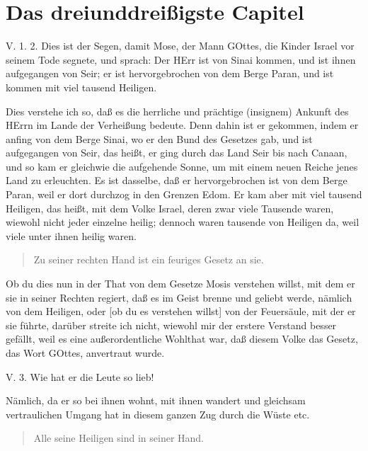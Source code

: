 \section{Das dreiunddreißigste Capitel}

\begin{schriftzitat}
V. 1. 2. Dies ist der Segen, damit Mose, der Mann GOttes, die Kinder Israel vor seinem Tode segnete, und sprach: Der HErr ist von Sinai kommen, und ist ihnen aufgegangen von Seir; er ist hervorgebrochen von dem Berge Paran, und ist kommen mit viel tausend Heiligen.
\end{schriftzitat}

Dies verstehe ich so, daß es die herrliche und prächtige (insignem) Ankunft des HErrn im Lande der Verheißung bedeute. Denn dahin ist er gekommen, indem er anfing von dem Berge Sinai, wo er den Bund des Gesetzes gab, und ist aufgegangen von Seir, das heißt, er ging durch das Land Seir bis nach Canaan, und so kam er gleichwie die aufgehende Sonne, um mit einem neuen Reiche jenes Land zu erleuchten. Es ist dasselbe, daß er hervorgebrochen ist von dem Berge Paran, weil er dort durchzog in den Grenzen Edom. Er kam aber mit viel tausend Heiligen, das heißt, mit dem Volke Israel, deren zwar viele Tausende waren, wiewohl nicht jeder einzelne heilig; dennoch waren tausende von Heiligen da, weil viele unter ihnen heilig waren.

\begin{quote}
Zu seiner rechten Hand ist ein feuriges Gesetz an sie.
\end{quote}

Ob du dies nun in der That von dem Gesetze Mosis verstehen willst, mit dem er sie in seiner Rechten regiert, daß es im Geist brenne
und geliebt werde, nämlich von dem Heiligen, oder [ob du es verstehen willst] von der Feuersäule, mit der er sie führte, darüber streite ich nicht, wiewohl mir der erstere Verstand besser gefällt, weil es eine außerordentliche Wohlthat war, daß diesem Volke das Gesetz, das Wort GOttes, anvertraut wurde.

\begin{schriftzitat}
V. 3. Wie hat er die Leute so lieb!
\end{schriftzitat}

Nämlich, da er so bei ihnen wohnt, mit ihnen wandert und gleichsam vertraulichen Umgang hat in diesem ganzen Zug durch die Wüste etc.

\begin{quote}
Alle seine Heiligen sind in seiner Hand.
\end{quote}

